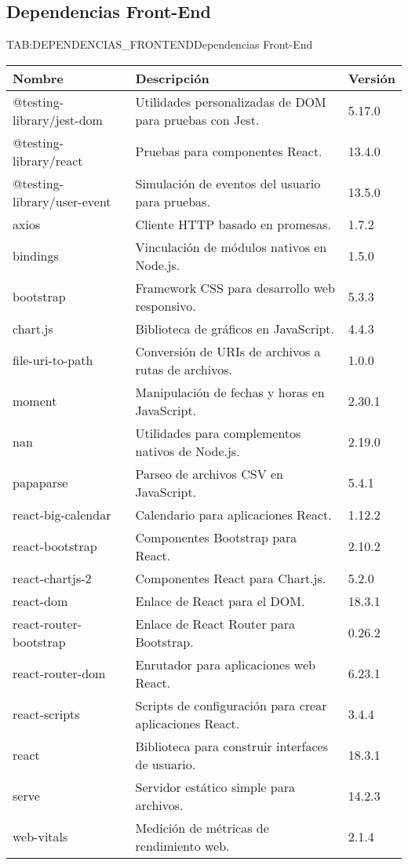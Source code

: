 \newpage

\subsection{Dependencias Front-End}

\begin{table}[Dependencias Front-End]{TAB:DEPENDENCIAS_FRONTEND}{Dependencias Front-End}
  \begin{tabular}{|p{6cm}|p{8cm}|p{2cm}|}
    \hline
    \textbf{Nombre} & \textbf{Descripción} & \textbf{Versión} \\
    \hline
    @testing-library/jest-dom & Utilidades personalizadas de DOM para pruebas con Jest. & 5.17.0 \\
    \hline
    @testing-library/react & Pruebas para componentes React. & 13.4.0 \\
    \hline
    @testing-library/user-event & Simulación de eventos del usuario para pruebas. & 13.5.0 \\
    \hline
    axios & Cliente HTTP basado en promesas. & 1.7.2 \\
    \hline
    bindings & Vinculación de módulos nativos en Node.js. & 1.5.0 \\
    \hline
    bootstrap & Framework CSS para desarrollo web responsivo. & 5.3.3 \\
    \hline
    chart.js & Biblioteca de gráficos en JavaScript. & 4.4.3 \\
    \hline
    file-uri-to-path & Conversión de URIs de archivos a rutas de archivos. & 1.0.0 \\
    \hline
    moment & Manipulación de fechas y horas en JavaScript. & 2.30.1 \\
    \hline
    nan & Utilidades para complementos nativos de Node.js. & 2.19.0 \\
    \hline
    papaparse & Parseo de archivos CSV en JavaScript. & 5.4.1 \\
    \hline
    react-big-calendar & Calendario para aplicaciones React. & 1.12.2 \\
    \hline
    react-bootstrap & Componentes Bootstrap para React. & 2.10.2 \\
    \hline
    react-chartjs-2 & Componentes React para Chart.js. & 5.2.0 \\
    \hline
    react-dom & Enlace de React para el DOM. & 18.3.1 \\
    \hline
    react-router-bootstrap & Enlace de React Router para Bootstrap. & 0.26.2 \\
    \hline
    react-router-dom & Enrutador para aplicaciones web React. & 6.23.1 \\
    \hline
    react-scripts & Scripts de configuración para crear aplicaciones React. & 3.4.4 \\
    \hline
    react & Biblioteca para construir interfaces de usuario. & 18.3.1 \\
    \hline
    serve & Servidor estático simple para archivos. & 14.2.3 \\
    \hline
    web-vitals & Medición de métricas de rendimiento web. & 2.1.4 \\
    \hline
  \end{tabular}
\end{table}

